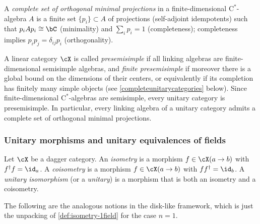 \documentclass[12pt,reqno]{amsart}
\newcommand{\Cstar}{\ensuremath{\mathrm{C}^{*}}}
\newcommand{\defn}[1]{\emph{#1}}
\begin{document}
A \defn{complete set of orthogonal minimal projections} in a finite-dimensional $\Cstar$-algebra $A$ is a finite set $\{p_i\}\subset A$ of projections (self-adjoint idempotents) such that $p_i A p_i\cong\bC$ (minimality) and $\sum_i p_i=1$ (completeness); completeness implies $p_i p_j=\delta_{ij}p_i$ (orthogonality). 

A linear category $\cX$ is called \defn{presemisimple} if all linking algebras are finite-dimensional semisimple algebras, and \defn{finite presemisimple} if moreover there is a global bound on the dimensions of their centers, or equivalently if its completion has finitely many simple objects (see \cref{completeunitarycategories} below). Since finite-dimensional $\Cstar$-algebras are semisimple, every unitary category is presemisimple. In particular, every linking algebra of a unitary category admits a complete set of orthogonal minimal projections.

\subsubsection{Unitary morphisms and unitary equivalences of fields}
\label{sec:coisometries-1}
Let $\cX$ be a dagger category. An \defn{isometry} is a morphism $f\in\cX(a\to b)$ with $f^\dag f=\id_a$. A \defn{coisometry} is a morphism $f\in\cX(a\to b)$ with $ff^\dag=\id_b$. A \defn{unitary isomorphism} (or a \defn{unitary}) is a morphism that is both an isometry and a coisometry.

The following are the analogous notions in the disk-like framework, which is just the unpacking of \cref{def:isometry-1field} for the case $n=1$.
\end{document}
